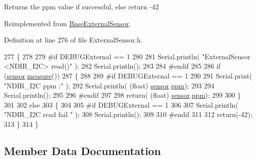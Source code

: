 \begin{DoxyReturn}{Returns}
the ppm value if successful, else return -\/42 
\end{DoxyReturn}


Reimplemented from \hyperlink{class_base_external_sensor_a1564f16deacf57b51b9948ac29db4291}{Base\+External\+Sensor}.



Definition at line 276 of file External\+Sensor.\+h.


\begin{DoxyCode}
277     \{
278         
279 \textcolor{preprocessor}{    #if DEBUGExternal == 1 }
280         
281         Serial.println( \textcolor{stringliteral}{"ExternalSensor <NDIR\_I2C> read()"} );
282         Serial.println();
283 
284 \textcolor{preprocessor}{    #endif}
285 
286         \textcolor{keywordflow}{if} (\hyperlink{class_external_sensor_3_01_n_d_i_r___i2_c_01_4_ae541c9cece7c38674b70114cdb74a7dc}{sensor}.\hyperlink{class_n_d_i_r___i2_c_ab8f50d38501d498b802b822bd4844ede}{measure}())
287         \{
288         
289 \textcolor{preprocessor}{        #if DEBUGExternal == 1 }
290 
291             Serial.print( \textcolor{stringliteral}{"NDIR\_I2C ppm :"} );
292             Serial.println( (\textcolor{keywordtype}{float}) \hyperlink{class_external_sensor_3_01_n_d_i_r___i2_c_01_4_ae541c9cece7c38674b70114cdb74a7dc}{sensor}.\hyperlink{class_n_d_i_r___i2_c_a7e5cfc725dba0f9c2bd1bd5ab3bb8600}{ppm});
293             
294             Serial.println();           
295 
296 \textcolor{preprocessor}{        #endif}
297 
298             \textcolor{keywordflow}{return}( (\textcolor{keywordtype}{float}) \hyperlink{class_external_sensor_3_01_n_d_i_r___i2_c_01_4_ae541c9cece7c38674b70114cdb74a7dc}{sensor}.\hyperlink{class_n_d_i_r___i2_c_a7e5cfc725dba0f9c2bd1bd5ab3bb8600}{ppm});
299             
300         \}
301         
302         \textcolor{keywordflow}{else}
303         \{
304         
305 \textcolor{preprocessor}{        #if DEBUGExternal == 1 }
306 
307             Serial.println( \textcolor{stringliteral}{"NDIR\_I2C read fail "} );
308             Serial.println();
309         
310 \textcolor{preprocessor}{        #endif}
311 
312             \textcolor{keywordflow}{return}(-42);
313         \}
314     \}
\end{DoxyCode}


\subsection{Member Data Documentation}
\mbox{\label{class_external_sensor_3_01_n_d_i_r___i2_c_01_4_ae541c9cece7c38674b70114cdb74a7dc}} 
